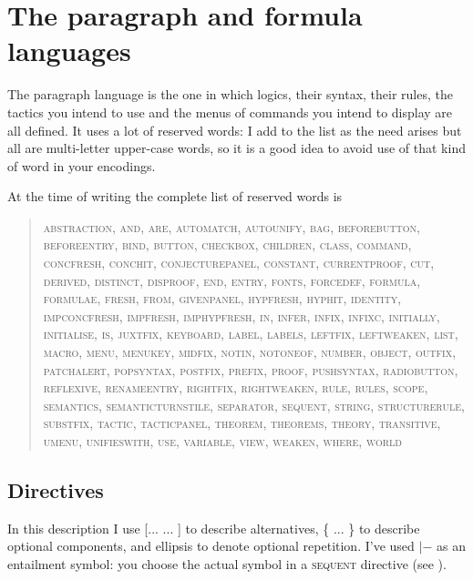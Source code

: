 \chapter{The paragraph and formula languages}
\label{appx:paraformlang}

The paragraph language is the one in which logics, their syntax, their rules, the tactics you intend to use and the menus of commands you intend to display are all defined. It uses a lot of reserved words: I add to the list as the need arises but all are multi-letter upper-case words, so it is a good idea to avoid use of that kind of word in your encodings.

At the time of writing the complete list of reserved words is
\begin{quote}
\textsc{abstraction, and, are, automatch, autounify, bag, beforebutton, beforeentry, bind, button, checkbox, children, class, command, concfresh, conchit, conjecturepanel, constant, currentproof, cut, derived, distinct, disproof, end, entry, fonts, forcedef, formula, formulae, fresh, from, givenpanel, hypfresh, hyphit, identity, impconcfresh, impfresh, imphypfresh, in, infer, infix, infixc, initially, initialise, is, juxtfix, keyboard, label, labels, leftfix, leftweaken, list, macro, menu, menukey, midfix, notin, notoneof, number, object, outfix, patchalert, popsyntax, postfix, prefix, proof, pushsyntax, radiobutton, reflexive, renameentry, rightfix, rightweaken, rule, rules, scope, semantics, semanticturnstile, separator, sequent, string, structurerule, substfix, tactic, tacticpanel, theorem, theorems, theory, transitive, umenu, unifieswith, use, variable, view, weaken, where, world}
\end{quote}

 
\section{Directives}

In this description I use [... {\textbar} ... ] to describe alternatives, \{ ... \} to describe optional components, and ellipsis to denote optional repetition. I've used $|-$ as an entailment symbol: you choose the actual symbol in a \textsc{sequent} directive (see ).

